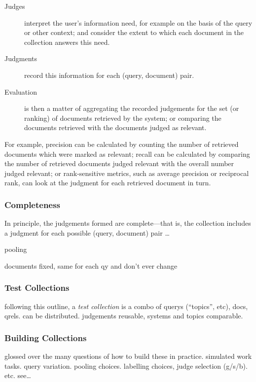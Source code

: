 \documentclass[openany]{now} %
\newcommand{\authornote}[3]{\marginpar{\tiny\color{#1}#2: #3}{\color{#1}{$\star$}}}
\newcommand{\paul}[1]{\authornote{blue}{Paul}{#1}}
\begin{document}
\begin{description}
	\item[Judges] interpret the user's information need, for example on the basis of the query or other context; and consider the extent to which each document in the collection answers this need.
	
	\item[Judgments] record this information for each (query, document) pair.
	
	\item[Evaluation] is then a matter of aggregating the recorded judgements for the set (or ranking) of documents retrieved by the system; or comparing the documents retrieved with the documents judged as relevant.
\end{description}

For example, precision can be calculated by counting the number of retrieved documents which were marked as relevant; recall can be calculated by comparing the number of retrieved documents judged relevant with the overall number judged relevant; or rank-sensitive metrics, such as average precision or reciprocal rank, can look at the judgment for each retrieved document in turn.

\subsubsection{Completeness}

In principle, the judgements formed are complete---that is, the collection includes a judgment for each possible (query, document) pair \dots

\paul{to write past here}

pooling

documents fixed, same for each qy and don't ever change

\subsubsection{Test Collections}

following this outline, a \emph{test collection} is a combo of querys (``topics'', etc), docs, qrels. can be distributed. judgements reusable, systems and topics comparable.

\subsubsection{Building Collections}

glossed over the many questions of how to build these in practice. simulated work tasks. query variation. pooling choices. labelling choices, judge selection (g/s/b). etc. see\dots
\end{document}
